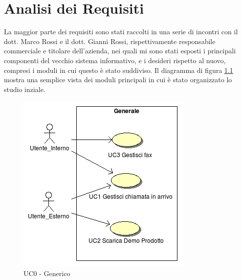 \chapter{Analisi dei Requisiti}
La maggior parte dei requisiti sono stati raccolti in una serie di incontri con il dott. Marco Rossi e il dott. Gianni Rossi, rispettivamente responsabile commerciale e titolare dell'azienda, nei quali mi sono stati esposti i principali componenti del vecchio sistema informativo, e i desideri rispetto al nuovo, compresi i moduli in cui questo \`e stato suddiviso. Il diagramma di figura \ref{UC0} mostra una semplice vista dei moduli principali in cui \`e stato organizzato lo studio inziale.

\begin{figure}[!ht]
\centering
 \includegraphics[scale=0.8]{./images/UC0_Generale.png}
\caption{UC0 - Generico}
\label{UC0}
\end{figure}

\newpage

